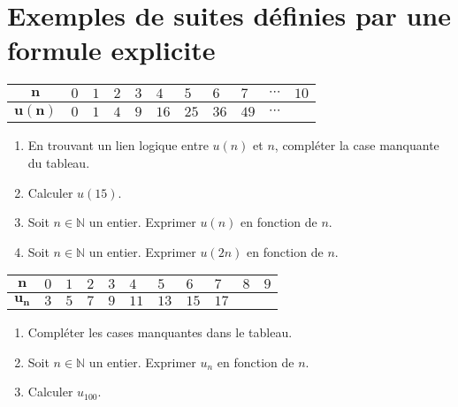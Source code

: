 \documentclass[11pt]{article}
\begin{document}
\section{Exemples de suites définies par une formule explicite}

\begin{exemple}
  \begin{center}
  \renewcommand{\arraystretch}{2}
  \begin{tabularx}{\textwidth}{|c|Y|Y|Y|Y|Y|Y|Y|Y|Y|Y|}
   \hline
   $\mathbf{n}$ & $0$ & $1$ & $2$ & $3$ & $4$ & $5$ & $6$ & $7$ & $\cdots$ &
   $10$ \\
   \hline
   $\mathbf{u(n)}$ & $0$ & $1$ & $4$ & $9$ & $16$ & $25$ & $36$ & $49$ &
   $\cdots$ & \\
   \hline
  \end{tabularx}
  \end{center}

  \begin{enumerate}
    \item En trouvant un lien logique entre $u(n)$ et $n$, compléter la case
      manquante du tableau.
    \item Calculer $u(15)$.
    \item Soit $n\in\mathbb{N}$ un entier. Exprimer $u(n)$ en fonction de $n$.
    \item Soit $n\in\mathbb{N}$ un entier. Exprimer $u(2n)$ en fonction de $n$.
  \end{enumerate}
\end{exemple}

\begin{exemple}
  \begin{center}
  \renewcommand{\arraystretch}{2}
  \begin{tabularx}{\textwidth}{|c|Y|Y|Y|Y|Y|Y|Y|Y|Y|Y|}
   \hline
   $\mathbf{n}$ & $0$ & $1$ & $2$ & $3$ & $4$ & $5$ & $6$ & $7$ & $8$ &
   $9$ \\
   \hline
   $\mathbf{u_n}$ & $3$ & $5$ & $7$ & $9$ & $11$ & $13$ & $15$ & $17$ &
   & \\
   \hline
  \end{tabularx}
  \end{center}
  \begin{enumerate}
    \item Compléter les cases manquantes dans le tableau.
    \item Soit $n\in\mathbb{N}$ un entier. Exprimer $u_n$ en fonction de $n$.
    \item Calculer $u_{100}$.
  \end{enumerate}
\end{exemple}
\end{document}
